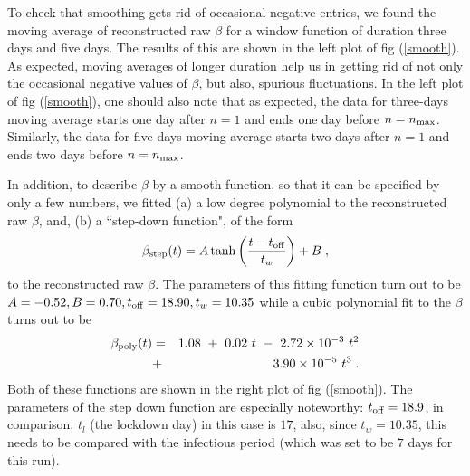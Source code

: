 \documentclass[aps,prd,10pt,twocolumn,nofootinbib]{revtex4-2}
\begin{document}
To check that smoothing gets rid of occasional negative entries, we found the moving average of reconstructed raw $\beta$ for a window function of duration three days and five days. The results of this are shown in the left plot of fig (\ref{smooth}).
As expected, moving averages of longer duration help us in getting rid of not only the occasional negative values of $\beta$, but also, spurious fluctuations. In the left plot of fig (\ref{smooth}), one should also note that as expected, the data for three-days moving average starts one day after $n=1$ and ends one day before $n=n_{\rm max}$. Similarly, the data for five-days moving average starts two days after $n=1$ and ends two days before $n=n_{\rm max}$.

In addition, to describe $\beta$ by a smooth function, so that it can be specified by only a few numbers,
we fitted (a) a low degree polynomial to the reconstructed raw $\beta$, and,
(b) a ``step-down function", of the form 
\begin{equation} \label{eq:step}
 \beta_{\rm step} (t) = A \tanh \left(\frac{t - t_{\rm off} }{t_w} \right) + B \; ,
\end{equation}
to the reconstructed raw $\beta$. The parameters of this fitting function turn out to be 
$A= -0.52, B = 0.70, t_{\rm off} = 18.90, t_{w} =  10.35$ while
a cubic polynomial fit to the $\beta$ turns out to be
\begin{eqnarray} \label{eq:poly}
 \beta_{\rm poly}(t) &=& 1.08 ~+~ 0.02 ~t ~-~ 2.72 \times 10^{-3} ~t^2 \nonumber \\
 &+& 3.90 \times 10^{-5} ~t^3 \; .
\end{eqnarray}
Both of these functions are shown in the right plot of  fig (\ref{smooth}). 
The parameters of the step down function are especially noteworthy: $t_{\rm off} = 18.9$, in comparison, $t_l$ (the lockdown day) in this case is $17$, also, since $t_w = 10.35$, this needs to be compared with the infectious period (which was set to be $7$ days for this run).

\end{document}
